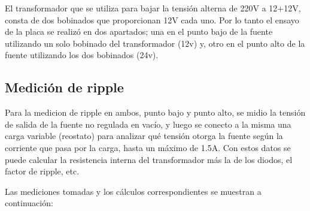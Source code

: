 \documentclass[chaptersright]{informeutn}
\begin{document}
      El transformador que se utiliza para bajar la tensión alterna de 220V a 12+12V, consta de dos bobinados que
      proporcionan 12V cada uno. Por lo tanto el ensayo de la placa se realizó en dos apartados; una en el punto bajo
      de la fuente utilizando un solo bobinado del transformador (12v) y, otro en el punto alto de la fuente utilizando
      los dos bobinados (24v).

      \subsection{Medición de ripple}
        Para la medicion de ripple en ambos, punto bajo y punto alto, se midio la tensión de salida de la fuente no
        regulada en vacío, y luego se conecto a la misma una carga variable (reostato) para analizar qué tensión
        otorga la fuente según la corriente que pasa por la carga, hasta un máximo de 1.5A. Con estos datos se puede
        calcular la resistencia interna del transformador más la de los diodos, el factor de ripple, etc.

        Las mediciones tomadas y los cálculos correspondientes se muestran a continuación:
\end{document}
